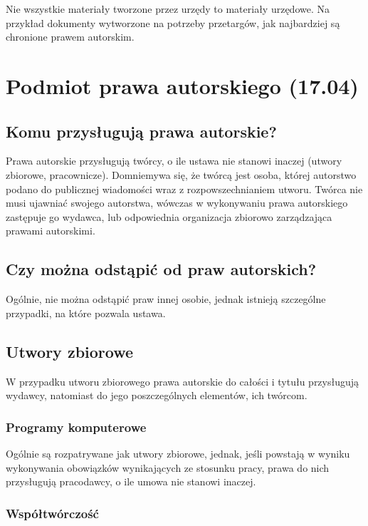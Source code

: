 \documentclass{article}
\begin{document}
Nie wszystkie materiały tworzone przez urzędy to materiały urzędowe.
Na przykład dokumenty wytworzone na potrzeby przetargów, jak najbardziej są chronione prawem autorskim.

\section{Podmiot prawa autorskiego (17.04)}

\subsection{Komu przysługują prawa autorskie?}

Prawa autorskie przysługują twórcy, o ile ustawa nie stanowi inaczej (utwory zbiorowe, pracownicze).
Domniemywa się, że twórcą jest osoba, której autorstwo podano do publicznej wiadomości wraz z rozpowszechnianiem utworu.
Twórca nie musi ujawniać swojego autorstwa, wówczas w wykonywaniu prawa autorskiego zastępuje go wydawca, lub odpowiednia organizacja zbiorowo zarządzająca prawami autorskimi.

\subsection{Czy można odstąpić od praw autorskich?}

Ogólnie, nie można odstąpić praw innej osobie, jednak istnieją szczególne przypadki, na które pozwala ustawa.

\subsection{Utwory zbiorowe}

W przypadku utworu zbiorowego prawa autorskie do całości i tytułu przysługują wydawcy, natomiast do jego poszczególnych elementów, ich twórcom.

\subsubsection{Programy komputerowe}

Ogólnie są rozpatrywane jak utwory zbiorowe, jednak, jeśli powstają w wyniku wykonywania obowiązków wynikających ze stosunku pracy, prawa do nich przysługują pracodawcy, o ile umowa nie stanowi inaczej.

\subsubsection{Współtwórczość}
\end{document}
